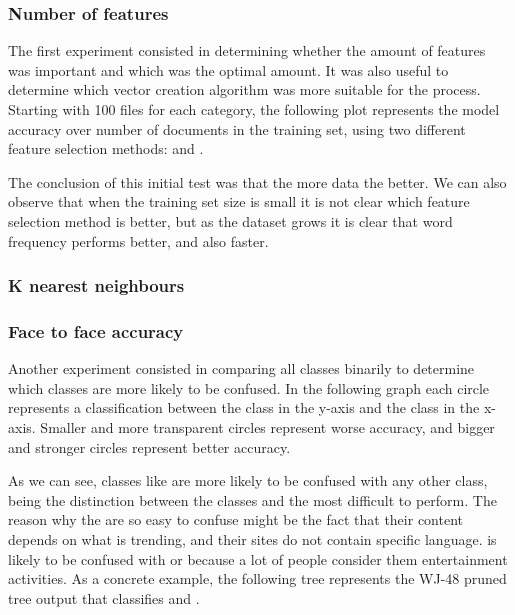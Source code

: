 \subsubsection{Number of features}
The first experiment consisted in determining whether the amount of features was important and which was the optimal amount. It was also useful to determine which vector creation algorithm was
more suitable for the process. Starting with 100 files for each category, the following plot represents the model accuracy over number of documents in the training set, using two different 
feature selection methods:  and . 

The conclusion of this initial test was that the more data the better. We can also observe that when the training set size is small it is not clear which feature selection method is better,
but as the dataset grows it is clear that word frequency performs better, and also faster.

\subsubsection{K nearest neighbours}

\subsubsection{Face to face accuracy}
Another experiment consisted in comparing all classes binarily to determine which classes are more likely to be confused. In the following graph each circle represents a classification 
between the class in the y-axis and the class in the x-axis. Smaller and more transparent circles represent worse accuracy, and bigger and stronger circles represent better accuracy. 

As we can see, classes like  are more likely to be confused with any other class, being the distinction between the classes  and  the most
difficult to perform. The reason why the  are so easy to confuse might be the fact that their content depends on what is trending, and their sites do not contain specific language.
 is likely to be confused with  or  because a lot of people consider them entertainment activities. 
As a concrete example, the following tree represents the WJ-48 pruned tree output that classifies  and .

